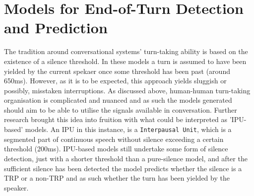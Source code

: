 \documentclass[logo,bsc,singlespacing,parskip]{infthesis}
\begin{document}
\section{Models for End-of-Turn Detection and Prediction}
The tradition around conversational systems' turn-taking ability is based on the existence of a silence threshold. In these models a turn is assumed to have been yielded by the current spekaer once some threshold has been past (around 650ms). However, as it is to be expected, this approach yields sluggish or possibly, misstaken interruptions. As discussed above, human-human turn-taking organisation is complicated and nuanced and as such the models generated should aim to be able to utilise the signals available in conversation. 
Further research brought this idea into fruition with what could be interpreted as 'IPU-based' models. An IPU in this instance, is a \texttt{Interpausal Unit}, which is a segmented part of continuous speech without silence exceeding a certain threshold (200ms). IPU-based models still undertake some form of silence detection, just with a shorter threshold than a pure-silence model, and after the sufficient silence has been detected the model predicts whether the silence is a TRP or a non-TRP and as such whether the turn has been yielded by the speaker.
\end{document}
